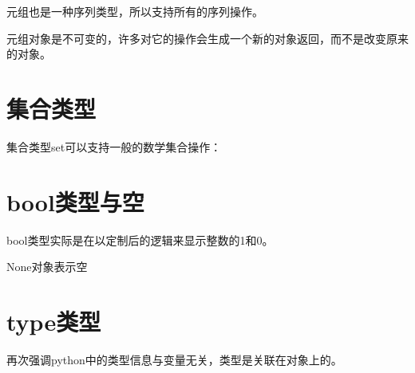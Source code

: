 		元组也是一种序列类型，所以支持所有的序列操作。

		元组对象是不可变的，许多对它的操作会生成一个新的对象返回，而不是改变原来的对象。

		
		
	\section{集合类型}

		集合类型set可以支持一般的数学集合操作：

		
		
	\section{bool类型与空}

		bool类型实际是在以定制后的逻辑来显示整数的1和0。

		None对象表示空
		
		

	\section{type类型}

		再次强调python中的类型信息与变量无关，类型是关联在对象上的。

		
